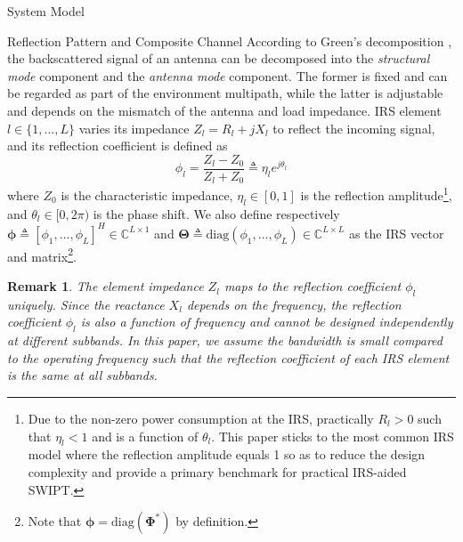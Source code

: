 \documentclass[journal]{IEEEtran}
\newtheorem{remark}{Remark}
\begin{document}
\begin{section}{System Model}
		\begin{subsection}{Reflection Pattern and Composite Channel}
			According to Green's decomposition \cite{Hansen1989}, the backscattered signal of an antenna can be decomposed into the \emph{structural mode} component and the \emph{antenna mode} component. The former is fixed and can be regarded as part of the environment multipath, while the latter is adjustable and depends on the mismatch of the antenna and load impedance. IRS element $l \in \{1, \dots, L\}$ varies its impedance $Z_l = R_l + j X_l$ to reflect the incoming signal, and its reflection coefficient is defined as
			\begin{equation}
				\phi_l = \frac{Z_l - Z_0}{Z_l + Z_0} \triangleq \eta_l e^{j\theta_l}
			\end{equation}
			where $Z_0$ is the characteristic impedance, $\eta_l \in [0, 1]$ is the reflection amplitude\footnote{Due to the non-zero power consumption at the IRS, practically $R_l > 0$ such that $\eta_l < 1$ and is a function of $\theta_l$. This paper sticks to the most common IRS model where the reflection amplitude equals \num{1} so as to reduce the design complexity and provide a primary benchmark for practical IRS-aided SWIPT.}, and $\theta_l \in [0,2\pi)$ is the phase shift. We also define respectively $\boldsymbol{\phi} \triangleq [\phi_1, \dots, \phi_L]^H \in \mathbb{C}^{L \times 1}$ and $\boldsymbol{\Theta} \triangleq \mathrm{diag}(\phi_1, \dots, \phi_L) \in \mathbb{C}^{L \times L}$ as the IRS vector and matrix\footnote{Note that $\boldsymbol{\phi}=\mathrm{diag}(\boldsymbol{\Phi}^*)$ by definition.}.

			\begin{remark}\label{re:reflection_coefficient}
				The element impedance $Z_l$ maps to the reflection coefficient $\phi_l$ uniquely. Since the reactance $X_l$ depends on the frequency, the reflection coefficient $\phi_l$ is also a function of frequency and cannot be designed independently at different subbands. In this paper, we assume the bandwidth is small compared to the operating frequency such that the reflection coefficient of each IRS element is the same at all subbands.
			\end{remark}


\end{subsection}
\end{section}
\end{document}
